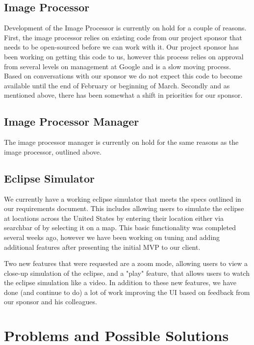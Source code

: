 \documentclass[10pt, onecolumn, draftclsnofoot, letterpaper, compsoc]{IEEEtran}
\begin{document}
\subsection{Image Processor}

Development of the Image Processor is currently on hold for a couple of reasons.
First, the image processor relies on existing code from our project sponsor that
needs to be open-sourced before we can work with it. Our project sponsor has
been working on getting this code to us, however this process relies on approval
from several levels on management at Google and is a slow moving process. Based
on conversations with our sponsor we do not expect this code to become available
until the end of February or beginning of March. Secondly and as mentioned above,
there has been somewhat a shift in priorities for our sponsor.

\subsection{Image Processor Manager}

The image processor manager is currently on hold for the same reasons as the image processor,
outlined above.

\subsection{Eclipse Simulator}

We currently have a working eclipse simulator that meets the specs outlined in
our requirements document. This includes allowing users to simulate the eclipse
at locations across the United States by entering their location either via searchbar
of by selecting it on a map. This basic functionality was completed several weeks
ago, however we have been working on tuning and adding additional features after
presenting the initial MVP to our client.

Two new features that were requested are a zoom mode, allowing users to view a
close-up simulation of the eclipse, and a "play" feature, that allows users
to watch the eclipse simulation like a video. In addition to these new features,
we have done (and continue to do) a lot of work improving the UI based on feedback
from our sponsor and his colleagues.


\section{Problems and Possible Solutions}
\end{document}
